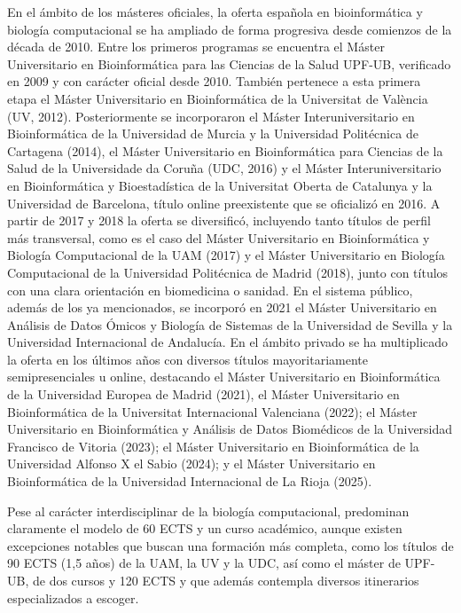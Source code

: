 \documentclass[
  11pt,
  a4paper,
  twoside]{scrreprt}
\begin{document}
En el ámbito de los másteres oficiales, la oferta española en
bioinformática y biología computacional se ha ampliado de forma
progresiva desde comienzos de la década de 2010. Entre los primeros
programas se encuentra el Máster Universitario en Bioinformática para
las Ciencias de la Salud UPF-UB, verificado en 2009 y con carácter
oficial desde 2010. También pertenece a esta primera etapa el Máster
Universitario en Bioinformática de la Universitat de València (UV,
2012). Posteriormente se incorporaron el Máster Interuniversitario en
Bioinformática de la Universidad de Murcia y la Universidad Politécnica
de Cartagena (2014), el Máster Universitario en Bioinformática para
Ciencias de la Salud de la Universidade da Coruña (UDC, 2016) y el
Máster Interuniversitario en Bioinformática y Bioestadística de la
Universitat Oberta de Catalunya y la Universidad de Barcelona, título
online preexistente que se oficializó en 2016. A partir de 2017 y 2018
la oferta se diversificó, incluyendo tanto títulos de perfil más
transversal, como es el caso del Máster Universitario en Bioinformática
y Biología Computacional de la UAM (2017) y el Máster Universitario en
Biología Computacional de la Universidad Politécnica de Madrid (2018),
junto con títulos con una clara orientación en biomedicina o sanidad. En
el sistema público, además de los ya mencionados, se incorporó en 2021
el Máster Universitario en Análisis de Datos Ómicos y Biología de
Sistemas de la Universidad de Sevilla y la Universidad Internacional de
Andalucía. En el ámbito privado se ha multiplicado la oferta en los
últimos años con diversos títulos mayoritariamente semipresenciales u
online, destacando el Máster Universitario en Bioinformática de la
Universidad Europea de Madrid (2021), el Máster Universitario en
Bioinformática de la Universitat Internacional Valenciana (2022); el
Máster Universitario en Bioinformática y Análisis de Datos Biomédicos de
la Universidad Francisco de Vitoria (2023); el Máster Universitario en
Bioinformática de la Universidad Alfonso X el Sabio (2024); y el Máster
Universitario en Bioinformática de la Universidad Internacional de La
Rioja (2025).

Pese al carácter interdisciplinar de la biología computacional,
predominan claramente el modelo de 60 ECTS y un curso académico, aunque
existen excepciones notables que buscan una formación más completa, como
los títulos de 90 ECTS (1,5 años) de la UAM, la UV y la UDC, así como el
máster de UPF-UB, de dos cursos y 120 ECTS y que además contempla
diversos itinerarios especializados a escoger.
\end{document}
